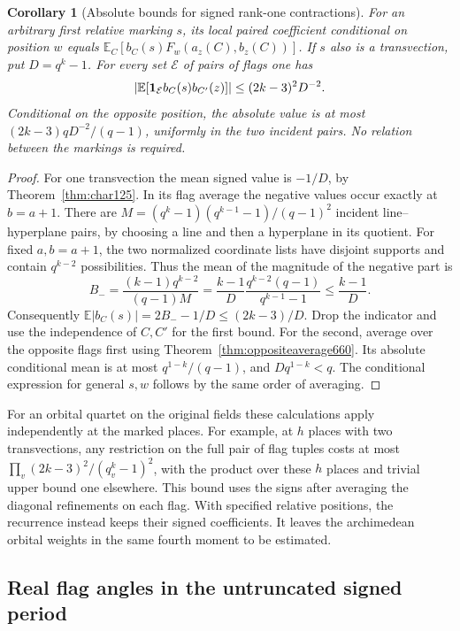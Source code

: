 \documentclass[a4paper,11pt]{article}
\newtheorem{corollary}[proposition]{Corollary}
\theoremstyle{definition}
\theoremstyle{remark}
\numberwithin{equation}{section}
\begin{document}
\begin{corollary}[Absolute bounds for signed rank-one contractions]
\leavevmode\label{cor:weightedtrans660}
For an arbitrary first relative marking \(s\), its local paired
coefficient conditional on position \(w\) equals
\(\mathbb E_C[b_C(s)F_w(a_z(C),b_z(C))]\). If \(s\) also is a
transvection, put \(D=q^k-1\). For every set \(\mathcal E\) of
pairs of flags one has
\[
 \left|\mathbb E[{\bf1}_{\mathcal E} b_C(s)b_{C'}(z)]\right|
          \le (2k-3)^2D^{-2}.
\]
Conditional on the opposite position, the absolute value is at
most \((2k-3)qD^{-2}/(q-1)\), uniformly in the two incident
pairs. No relation between the markings is required.
\end{corollary}
\begin{proof}
For one transvection the mean signed value is \(-1/D\), by
Theorem~\ref{thm:char125}. In its flag average the negative
values occur exactly at \(b=a+1\). There are
\(M=(q^k-1)(q^{k-1}-1)/(q-1)^2\) incident line--hyperplane
pairs, by choosing a line and then a hyperplane in its quotient.
For fixed \(a,b=a+1\), the two normalized coordinate lists
have disjoint supports and contain \(q^{k-2}\) possibilities.
Thus the mean of the magnitude of the negative part is
\[
  B_-=\frac{(k-1)q^{k-2}}{(q-1)M}
     =\frac{k-1}{D}\frac{q^{k-2}(q-1)}{q^{k-1}-1}
     \le\frac{k-1}{D}.
\]
Consequently \(\mathbb E|b_C(s)|=2B_--1/D\le(2k-3)/D\).
Drop the indicator and use the independence of \(C,C'\) for
the first bound. For the second, average over the opposite flags
first using Theorem~\ref{thm:oppositeaverage660}. Its absolute
conditional mean is at most \(q^{1-k}/(q-1)\), and
\(D q^{1-k}<q\). The conditional expression for general \(s,w\)
follows by the same order of averaging.
\end{proof}

For an orbital quartet on the original fields these calculations
apply independently at the marked places. For example, at \(h\)
places with two transvections, any restriction on the full pair
of flag tuples costs at most
\(\prod_{v}(2k-3)^2/(q_v^k-1)^2\), with the product over these
\(h\) places and trivial upper bound one elsewhere. This bound
uses the signs after averaging the diagonal refinements on each
flag. With specified relative positions, the recurrence instead
keeps their signed coefficients. It leaves the archimedean
orbital weights in the same fourth moment to be estimated.


\subsection{Real flag angles in the untruncated signed period}
\label{sec:realflag664}
\end{document}
